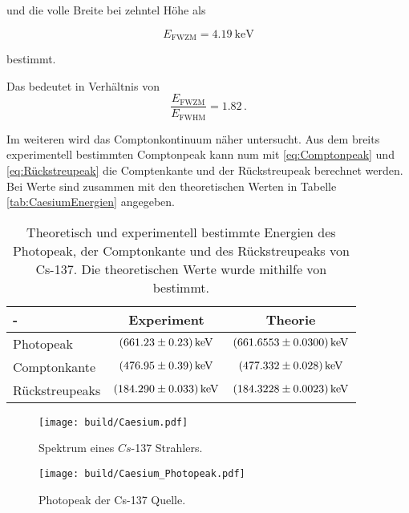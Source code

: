 und die volle Breite bei zehntel Höhe als

\begin{equation*}
    E_{\text{FWZM}} =  \SI{4.19}{\kilo\eV}
\end{equation*}

bestimmt.

Das bedeutet in Verhältnis von 
\begin{equation*}
    \frac{E_{\text{FWZM}}}{E_{\text{FWHM}}} = 1.82\,.
\end{equation*}

Im weiteren wird das Comptonkontinuum näher untersucht.
Aus dem breits experimentell bestimmten Comptonpeak kann num mit \autoref{eq:Comptonpeak} und \autoref{eq:Rückstreupeak}  die Comptenkante und der Rückstreupeak berechnet werden.
Bei Werte sind zusammen mit den theoretischen Werten in Tabelle \autoref{tab:CaesiumEnergien} angegeben.

\begin{table}
    \centering
    \caption{Theoretisch und experimentell bestimmte Energien des Photopeak, der Comptonkante und des Rückstreupeaks von Cs-137. Die theoretischen Werte wurde mithilfe von \cite{LNHB} bestimmt.}
    \label{tab:CaesiumEnergien}
    \begin{tabular}{l S[table-format=3.2(4), separate-uncertainty] S[table-format=3.4(4), separate-uncertainty]}
        \toprule
        {-} & {Experiment} & {Theorie}\\
        \midrule 
        Photopeak       & $\SI{661.23 \pm 0.23 }{\kilo\eV}$ & $\SI{661.6553 \pm 0.030}{\kilo\eV}$  \\ 
        Comptonkante    & $\SI{476.95 \pm 0.39 }{\kilo\eV}$ & $\SI{477.332 \pm 0.028}{\kilo\eV}$    \\ 
        Rückstreupeaks  & $\SI{184.290 \pm 0.033 }{\kilo\eV}$ & $\SI{184.3228 \pm 0.0023}{\kilo\eV}$  \\ 
        \bottomrule
    \end{tabular}
\end{table}





\begin{figure}[H]
    \centering
    \texttt{[image: build/Caesium.pdf]}
    \caption{Spektrum eines $Cs$-137 Strahlers.}
    \label{fig:CeasiumSpektrum}
\end{figure}

\begin{figure}[H]
    \centering
    \texttt{[image: build/Caesium\_Photopeak.pdf]}
    \caption{Photopeak der Cs-137 Quelle.}
    \label{fig:CaesiumPhotopeak}
\end{figure}
